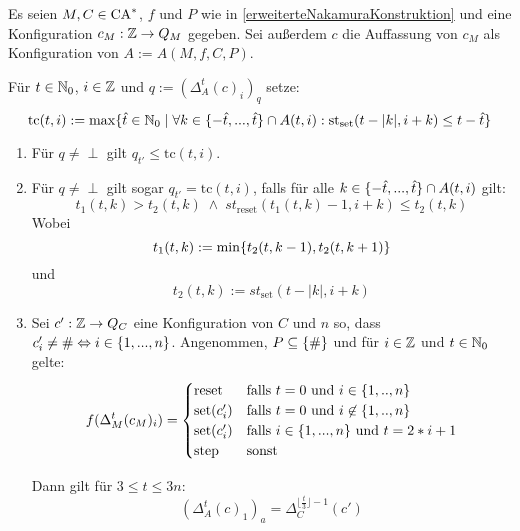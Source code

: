\begin{satz}
    \label{timeNakamuraConstruction}
    Es seien $M, C \in \textrm{CA}^*$, $f$ und $P$ wie in \cref{erweiterteNakamuraKonstruktion} und eine Konfiguration $c_M: \mathbb{Z} \to Q_M$ gegeben.
    Sei außerdem $c$ die Auffassung von $c_M$ als Konfiguration von $A := A(M, f, C, P)$.
    
    Für $t \in \mathbb{N}_0$, $i \in \mathbb{Z}$ und $q := (\Delta_{A}^t(c)_i)_q$ setze:
    \[
        \mathrm{tc}(t, i) := \max \{ { \hat{t} \in \mathbb{N}_0} \; | \; {
                \forall k \in \{ {-\hat{t}, ..., \hat{t} } \} \cap A(t, i):
                \mathrm{st}_{\mathrm{set}}(t-|k|, i+k) \leq t - \hat{t}
            } \}
    \]
    \begin{enumerate}
        \item
            Für $q \neq \perp$ gilt $q_{t'} \leq \mathrm{tc}(t, i)$.
        \item
            Für $q \neq \perp$ gilt sogar  $q_{t'} = \mathrm{tc}(t, i)$, falls für alle $k \in \{ {-\hat{t}, ..., \hat{t} } \} \cap A(t, i)$ gilt:
            \[
                t_1(t, k) > t_2(t, k)
                \; \land \;
                st_{\mathrm{reset}}(t_1(t, k) - 1, i + k) \leq t_2(t, k)
            \]
            Wobei
            \[
                t_1(t, k) := \min \{ { t_2(t, k - 1), t_2(t, k + 1) } \}
            \]
            und
            \[
                t_2(t, k) := st_{\mathrm{set}}(t - |k|, i + k)
            \]
        \item
            Sei $c': \mathbb{Z} \to Q_C$ eine Konfiguration von $C$ und $n$ so, dass $c'_i \neq \# \Leftrightarrow i \in \{ { 1, ..., n } \}$.
            Angenommen, $P \subseteq \{ { \# } \} $ und für $i \in \mathbb{Z}$ und $t \in \mathbb{N}_0$ gelte:
            \[
                f(\Delta_M^t(c_M)_i) =
                \begin{cases}
                    \mathrm{reset} & \text{falls } t = 0 \text{ und } i \in \{ {1, .., n} \} \\
                    \mathrm{set}(c'_i) & \text{falls } t = 0 \text{ und } i \not\in \{ {1, .., n} \} \\
                    \mathrm{set}(c'_i) & \text{falls } i \in \{ {1, ..., n} \} \text{ und } t = 2 * i + 1 \\
                    \mathrm{step} & \text{sonst}
                \end{cases}
            \]
            
            Dann gilt für $3 \leq t \leq 3n$:
            \[
                (\Delta^{t}_A(c)_1)_a = \Delta^{\lfloor \frac{t}{3} \rfloor - 1}_C(c')
            \]
     \end{enumerate}
\end{satz}